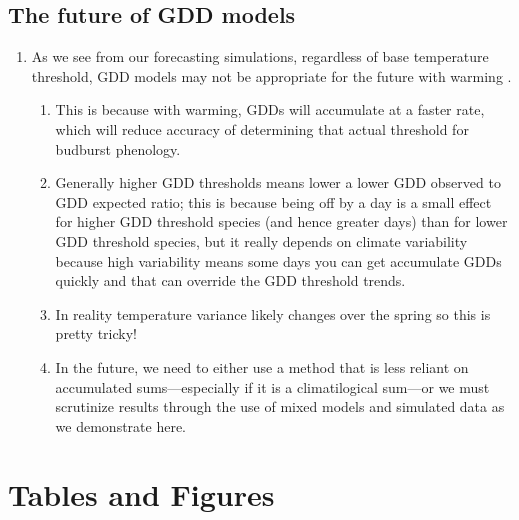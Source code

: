 \documentclass{article}\usepackage[]{graphicx}\usepackage[]{color}
\begin{document}
\subsection*{The future of GDD models}
\begin{enumerate}
\item As we see from our forecasting simulations, regardless of base temperature threshold, GDD models may not be appropriate for the future with warming \citep{Man2010}. 
  \begin{enumerate}
  \item This is because with warming, GDDs will accumulate at a faster rate, which will reduce accuracy of determining that actual threshold for budburst phenology. 
  \item Generally higher GDD thresholds means lower a lower GDD observed to GDD expected ratio; this is because being off by a day is a small effect for higher GDD threshold species (and hence greater days) than for lower GDD threshold species, but it really depends on climate variability because high variability means some days you can get accumulate GDDs quickly and that can override the GDD threshold trends. 
  \item In reality temperature variance likely changes over the spring so this is pretty tricky! 
  \item In the future, we need to either use a method that is less reliant on accumulated sums---especially if it is a climatilogical sum---or we must scrutinize results through the use of mixed models and simulated data as we demonstrate here. 
  \end{enumerate}
\end{enumerate}






\section*{Tables and Figures}
  
\end{document}
